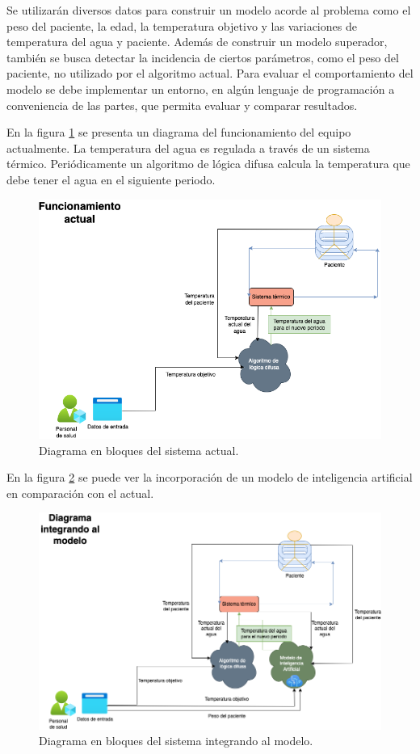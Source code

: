 \documentclass[
11pt, %
]{charter}
\begin{document}
Se utilizarán diversos datos para construir un modelo acorde al problema como el peso del paciente, la edad, la temperatura objetivo y las variaciones de temperatura del agua y paciente. Además de construir un modelo superador, también se busca detectar la incidencia de ciertos parámetros, como el peso del paciente, no utilizado por el algoritmo actual. Para evaluar el comportamiento del modelo se debe implementar un entorno, en algún lenguaje de programación a conveniencia de las partes, que permita evaluar y comparar resultados. 

En la figura \ref{fig:diagBloquesActual} se presenta un diagrama del funcionamiento del equipo actualmente. La temperatura del agua es regulada a través de un sistema térmico. Periódicamente un algoritmo de lógica difusa calcula la temperatura que debe tener el agua en el siguiente periodo.

\begin{figure}[htpb]
	\centering 
	\includegraphics[width=.65\textwidth]{./Figuras/amrra-diagrama1.png}
	\caption{Diagrama en bloques del sistema actual.}
	\label{fig:diagBloquesActual}
\end{figure}

En la figura  \ref{fig:diagBloquesFuturo} se puede ver la incorporación de un modelo de inteligencia artificial en comparación con el actual.

\begin{figure}[htpb]
	\centering 
	\includegraphics[width=.65\textwidth]{./Figuras/amrra-diagrama2.png}
	\caption{Diagrama en bloques del sistema integrando al modelo.}
	\label{fig:diagBloquesFuturo}
\end{figure}
\end{document}
